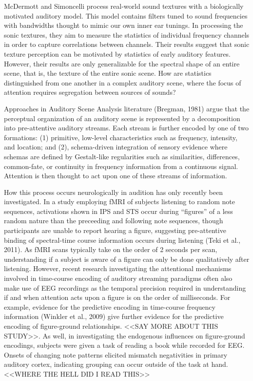 McDermott and Simoncelli process real-world sound textures with a biologically motivated auditory model.  This model contains filters tuned to sound frequencies with bandwidths thought to mimic our own inner ear tunings.  In processing the sonic textures, they aim to measure the statistics of individual frequency channels in order to capture correlations between channels.  Their results suggest that sonic texture perception can be motivated by statistics of early auditory features.  However, their results are only generalizable for the spectral shape of an entire scene, that is, the texture of the entire sonic scene.  How are statistics distinguished from one another in a complex auditory scene, where the focus of attention requires segregation between sources of sounds?  
	
Approaches in Auditory Scene Analysis literature (Bregman, 1981) argue that the perceptual organization of an auditory scene is represented by a decomposition into pre-attentive auditory streams. Each stream is further encoded by one of two formations: (1) primitive, low-level characteristics such as frequency, intensity, and location; and (2), schema-driven integration of sensory evidence where schemas are defined by Gestalt-like regularities such as similarities, differences, common-fate, or continuity in frequency information from a continuous signal.  Attention is then thought to act upon one of these streams of information.  

How this process occurs neurologically in audition has only recently been investigated. In a study employing fMRI of subjects listening to random note sequences, activations shown in IPS and STS occur during ``figures'' of a less random nature than the preceeding and following note sequences, though participants are unable to report hearing a figure, suggesting pre-attentive binding of spectral-time course information occurs during listening (Teki et al., 2011). As fMRI scans typically take on the order of 2 seconds per scan, understanding if a subject is aware of a figure can only be done qualitatively after listening.  However, recent research investigating the attentional mechanisms involved in time-course encoding of auditory streaming paradigms often also make use of EEG recordings as the temporal precision required in understanding if and when attention acts upon a figure is on the order of milliseconds.  For example, evidence for the predictive encoding in time-course frequency information (Winkler et al., 2009) give further evidence for the predictive encoding of figure-ground relationships.  <<SAY MORE ABOUT THIS STUDY>>.  As well, in investigating the endogenous influences on figure-ground encodings, subjects were given a task of reading a book while recorded for EEG.  Onsets of changing note patterns elicited mismatch negativities in primary auditory cortex, indicating grouping can occur outside of the task at hand. <<WHERE THE HELL DID I READ THIS>>


